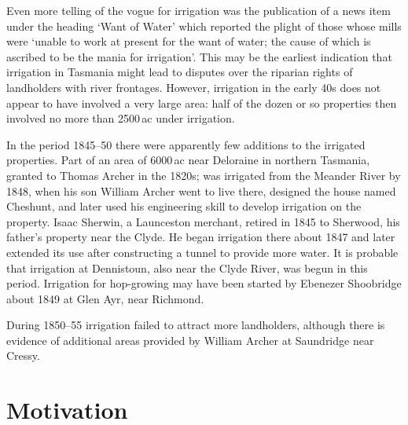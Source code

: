 Even more telling of the vogue for irrigation was the publication of a
news item under the heading `Want of Water' which reported the plight
of those whose mills were `unable to work at present for the want of
water; the cause of which is ascribed to be the mania for
irrigation'.  This may
be the earliest indication that irrigation in Tasmania might lead to
disputes over the riparian rights of landholders with river frontages.
However, irrigation in the early 40s does not appear to have involved
a very large area: half of the dozen or so properties then involved no
more than 2500\,ac under irrigation.

In the period 1845--50 there were apparently few additions to the
irrigated properties.  Part of an area of 6000\,ac near Deloraine in
northern Tasmania, granted to Thomas Archer in the 1820s; was
irrigated from the Meander River by 1848, when his son William Archer
went to live there, designed the house named Ches\-hunt, and later used
his engineering skill to develop irrigation on the property.  Isaac
Sherwin, a Launceston merchant, retired in 1845 to Sherwood, his
father's property near the Clyde.  He began irrigation there about
1847 and later extended its use after constructing a tunnel to provide
more water.  It is probable that irrigation at Dennistoun, also near
the Clyde River, was begun in this period.  Irrigation for hop-growing
may have been started by Ebenezer Shoobridge about 1849 at Glen Ayr,
near Richmond.

During 1850--55 irrigation failed to attract more landholders,
although there is evidence of additional areas provided by William
Archer at Saundridge near Cressy.\fn{\citet[p.\,30]{masoncox1994}.}

\section*{Motivation}


